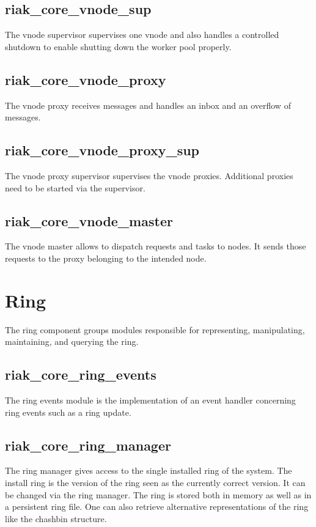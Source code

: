 	\subsection{riak\_core\_vnode\_sup}
		The vnode supervisor supervises one vnode and also handles a controlled shutdown to enable shutting down the worker pool properly.
	
	\subsection{riak\_core\_vnode\_proxy}
		The vnode proxy receives messages and handles an inbox and an overflow of messages.
	
	\subsection{riak\_core\_vnode\_proxy\_sup}
		The vnode proxy supervisor supervises the vnode proxies.
		Additional proxies need to be started via the supervisor.
	
	\subsection{riak\_core\_vnode\_master}
		The vnode master allows to dispatch requests and tasks to nodes.
		It sends those requests to the proxy belonging to the intended node.
	

\section{Ring}
	The ring component groups modules responsible for representing, manipulating, maintaining, and querying the ring.
	\subsection{riak\_core\_ring\_events}
		The ring events module is the implementation of an event handler concerning ring events such as a ring update.
	
	\subsection{riak\_core\_ring\_manager}
		The ring manager gives access to the single installed ring of the system.
		The install ring is the version of the ring seen as the currently correct version.
		It can be changed via the ring manager.
		The ring is stored both in memory as well as in a persistent ring file.
		One can also retrieve alternative representations of the ring like the chashbin structure.
	
